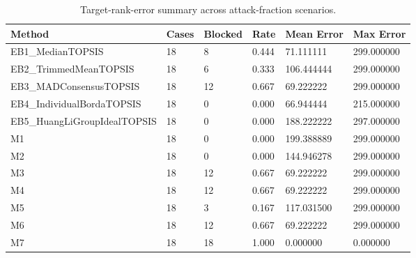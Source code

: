 \begin{table}[htbp]
\centering
\small
\caption{Target-rank-error summary across attack-fraction scenarios.}
\label{tab:method_target_error_summary}
\begin{tabular}{llllll}
\hline
Method & Cases & Blocked & Rate & Mean Error & Max Error \\
\hline
EB1\_MedianTOPSIS & 18 & 8 & 0.444 & 71.111111 & 299.000000 \\
EB2\_TrimmedMeanTOPSIS & 18 & 6 & 0.333 & 106.444444 & 299.000000 \\
EB3\_MADConsensusTOPSIS & 18 & 12 & 0.667 & 69.222222 & 299.000000 \\
EB4\_IndividualBordaTOPSIS & 18 & 0 & 0.000 & 66.944444 & 215.000000 \\
EB5\_HuangLiGroupIdealTOPSIS & 18 & 0 & 0.000 & 188.222222 & 297.000000 \\
M1 & 18 & 0 & 0.000 & 199.388889 & 299.000000 \\
M2 & 18 & 0 & 0.000 & 144.946278 & 299.000000 \\
M3 & 18 & 12 & 0.667 & 69.222222 & 299.000000 \\
M4 & 18 & 12 & 0.667 & 69.222222 & 299.000000 \\
M5 & 18 & 3 & 0.167 & 117.031500 & 299.000000 \\
M6 & 18 & 12 & 0.667 & 69.222222 & 299.000000 \\
M7 & 18 & 18 & 1.000 & 0.000000 & 0.000000 \\
\hline
\end{tabular}
\end{table}
